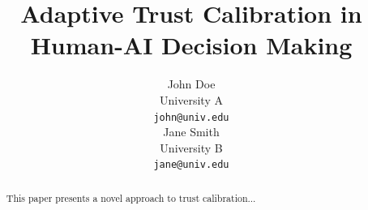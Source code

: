 \documentclass{article}
\title{Adaptive Trust Calibration in Human-AI Decision Making}
\author{
John Doe \\
University A \\
\texttt{john@univ.edu} \\
\And
Jane Smith \\
University B \\
\texttt{jane@univ.edu}
}
\begin{document}
\maketitle

\begin{abstract}
This paper presents a novel approach to trust calibration...
\end{abstract}











\end{document}
